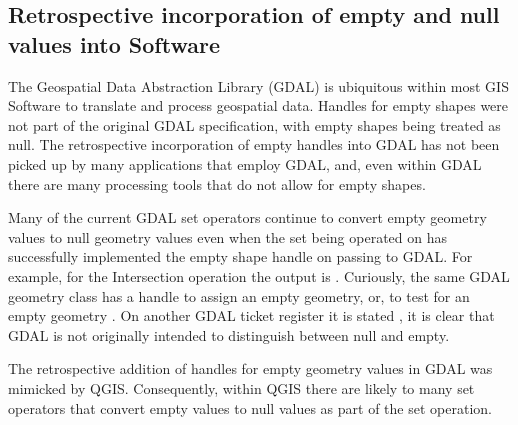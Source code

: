 \documentclass[letterpaper,11pt,english]{sphinxmanual}
\begin{document}
\subsection{Retrospective incorporation of empty and null values into Software}
\label{\detokenize{concept:retrospective-incorporation-of-empty-and-null-values-into-software}}
The Geospatial Data Abstraction Library (GDAL) is ubiquitous within most GIS Software to translate and process geospatial data.  Handles for empty shapes were not part of the original GDAL specification, with empty shapes being treated as null.   The retrospective incorporation of empty handles into GDAL has not been picked up by many applications that employ GDAL, and, even within GDAL there are many processing tools that do not allow for empty shapes.

Many of the current GDAL set operators continue to convert empty geometry values to null geometry values even when the set being operated on has successfully implemented the empty shape handle on passing to GDAL.  For example, for the Intersection operation the output is  .  Curiously, the same GDAL geometry class has a handle to assign an empty geometry, or, to test for an empty geometry .  On another GDAL ticket register it is stated  , it is clear that GDAL is not originally intended to distinguish between null and empty.

The retrospective addition of handles for empty geometry values in GDAL was mimicked by QGIS.  Consequently, within QGIS there are likely to many set operators that convert empty values to null values as part of the set operation.
\end{document}
